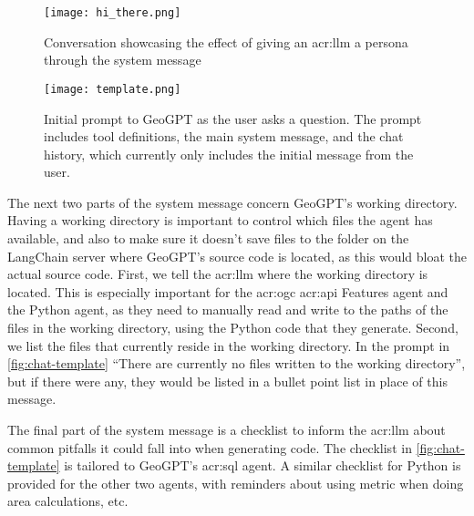 \begin{figure}[H]
    \centering
    \texttt{[image: hi\_there.png]}
    \caption[LLM persona example]{Conversation showcasing the effect of giving an \acrshort{acr:llm} a persona through the system message}
    \label{fig:effect-of-system-message}
\end{figure}

\begin{figure}
    \centering
    \texttt{[image: template.png]}
    \caption[Initial prompt to GeoGPT as the user asks a question]{Initial prompt to GeoGPT as the user asks a question. The prompt includes tool definitions, the main system message, and the chat history, which currently only includes the initial message from the user.}
    \label{fig:chat-template}
\end{figure}

The next two parts of the system message concern GeoGPT's working directory. Having a working directory is important to control which files the agent has available, and also to make sure it doesn't save files to the folder on the LangChain server where GeoGPT's source code is located, as this would bloat the actual source code. First, we tell the \acrshort{acr:llm} where the working directory is located. This is especially important for the \acrshort{acr:ogc} \acrshort{acr:api} Features agent and the Python agent, as they need to manually read and write to the paths of the files in the working directory, using the Python code that they generate. Second, we list the files that currently reside in the working directory. In the prompt in \autoref{fig:chat-template} \enquote{There are currently no files written to the working directory}, but if there were any, they would be listed in a bullet point list in place of this message.

The final part of the system message is a checklist to inform the \acrshort{acr:llm} about common pitfalls it could fall into when generating code. The checklist in \autoref{fig:chat-template} is tailored to GeoGPT's \acrshort{acr:sql} agent. A similar checklist for Python is provided for the other two agents, with reminders about using metric  when doing area calculations, etc.


